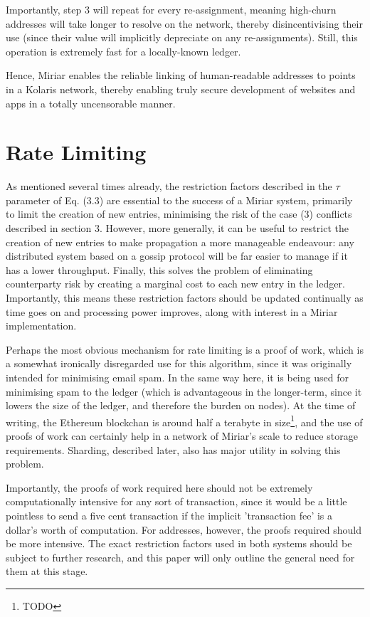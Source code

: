 \documentclass{extreport}
\begin{document}
Importantly, step 3 will repeat for every re-assignment, meaning high-churn addresses will take longer to resolve on the network, thereby disincentivising their use (since their value will implicitly depreciate on any re-assignments). Still, this operation is extremely fast for a locally-known ledger.

Hence, Miriar enables the reliable linking of human-readable addresses to points in a Kolaris network, thereby enabling truly secure development of websites and apps in a totally uncensorable manner.

\chapter{Rate Limiting}
\label{sec:org9f56f8d}

As mentioned several times already, the restriction factors described in the \(\tau\) parameter of Eq. (3.3) are essential to the success of a Miriar system, primarily to limit the creation of new entries, minimising the risk of the case (3) conflicts described in section 3. However, more generally, it can be useful to restrict the creation of new entries to make propagation a more manageable endeavour: any distributed system based on a gossip protocol will be far easier to manage if it has a lower throughput. Finally, this solves the problem of eliminating counterparty risk by creating a marginal cost to each new entry in the ledger. Importantly, this means these restriction factors should be updated continually as time goes on and processing power improves, along with interest in a Miriar implementation.

Perhaps the most obvious mechanism for rate limiting is a proof of work, which is a somewhat ironically disregarded use for this algorithm, since it was originally intended for minimising email spam. In the same way here, it is being used for minimising spam to the ledger (which is advantageous in the longer-term, since it lowers the size of the ledger, and therefore the burden on nodes). At the time of writing, the Ethereum blockchan is around half a terabyte in size\footnote{TODO}, and the use of proofs of work can certainly help in a network of Miriar's scale to reduce storage requirements. Sharding, described later, also has major utility in solving this problem.

Importantly, the proofs of work required here should not be extremely computationally intensive for any sort of transaction, since it would be a little pointless to send a five cent transaction if the implicit 'transaction fee' is a dollar's worth of computation. For addresses, however, the proofs required should be more intensive. The exact restriction factors used in both systems should be subject to further research, and this paper will only outline the general need for them at this stage.
\end{document}
